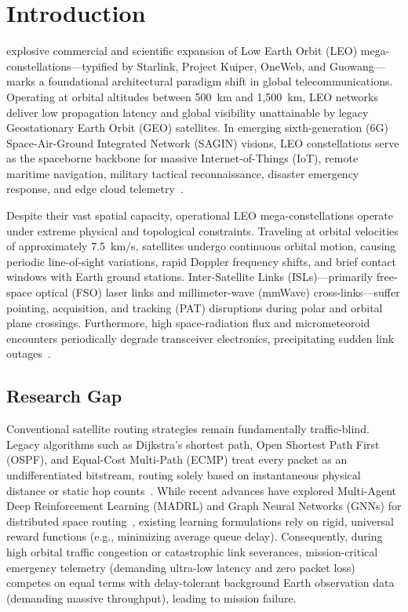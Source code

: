 \documentclass[journal]{IEEEtran}
\begin{document}
\section{Introduction}
 explosive commercial and scientific expansion of Low Earth Orbit (LEO) mega-constellations---typified by Starlink, Project Kuiper, OneWeb, and Guowang---marks a foundational architectural paradigm shift in global telecommunications. Operating at orbital altitudes between 500~km and 1,500~km, LEO networks deliver low propagation latency and global visibility unattainable by legacy Geostationary Earth Orbit (GEO) satellites. In emerging sixth-generation (6G) Space-Air-Ground Integrated Network (SAGIN) visions, LEO constellations serve as the spaceborne backbone for massive Internet-of-Things (IoT), remote maritime navigation, military tactical reconnaissance, disaster emergency response, and edge cloud telemetry~\cite{kodheli2021satellite, zhang20196g}.

Despite their vast spatial capacity, operational LEO mega-constellations operate under extreme physical and topological constraints. Traveling at orbital velocities of approximately 7.5~km/s, satellites undergo continuous orbital motion, causing periodic line-of-sight variations, rapid Doppler frequency shifts, and brief contact windows with Earth ground stations. Inter-Satellite Links (ISLs)---primarily free-space optical (FSO) laser links and millimeter-wave (mmWave) cross-links---suffer pointing, acquisition, and tracking (PAT) disruptions during polar and orbital plane crossings. Furthermore, high space-radiation flux and micrometeoroid encounters periodically degrade transceiver electronics, precipitating sudden link outages~\cite{kaushal2017optical, cheng2019space}.

\subsection{Research Gap}
Conventional satellite routing strategies remain fundamentally traffic-blind. Legacy algorithms such as Dijkstra's shortest path, Open Shortest Path First (OSPF), and Equal-Cost Multi-Path (ECMP) treat every packet as an undifferentiated bitstream, routing solely based on instantaneous physical distance or static hop counts~\cite{dijkstra1959note}. While recent advances have explored Multi-Agent Deep Reinforcement Learning (MADRL) and Graph Neural Networks (GNNs) for distributed space routing~\cite{wang2021multi, chen2022graph}, existing learning formulations rely on rigid, universal reward functions (e.g., minimizing average queue delay). Consequently, during high orbital traffic congestion or catastrophic link severances, mission-critical emergency telemetry (demanding ultra-low latency and zero packet loss) competes on equal terms with delay-tolerant background Earth observation data (demanding massive throughput), leading to mission failure.
\end{document}
